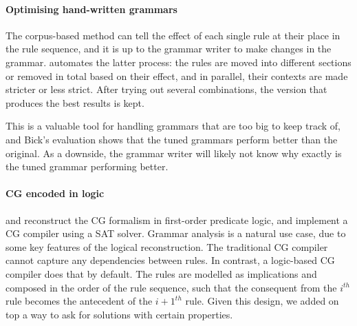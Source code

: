 \paragraph{Optimising hand-written grammars}
The corpus-based method can tell the effect of each single rule at their place in the rule sequence, and it is up to the grammar writer to make changes in the grammar.
\cite{bick2013tuning} automates the latter process: the rules are moved into different sections or removed in total based on their effect, and in parallel, their contexts are made stricter or less strict.
After trying out several combinations, the version that produces the best results is kept.

This is a valuable tool for handling grammars that are too big to keep track of, and Bick's evaluation shows that the tuned grammars perform better than the original.
As a downside, the grammar writer will likely not know why exactly is the tuned grammar performing better.



\paragraph{CG encoded in logic}

\cite{lager98} and \cite{lager_nivre01} reconstruct the CG formalism in first-order predicate logic, and \cite{listenmaa_claessen2015} implement a CG compiler using a SAT solver.
Grammar analysis is a natural use case, due to some key features of the logical reconstruction.
The traditional CG compiler 
 cannot capture any dependencies between rules.
In contrast, a logic-based CG compiler does that by default. 
The rules are modelled as implications and composed in the order of the rule sequence, such that 
the consequent from the $i^{th}$ rule becomes the antecedent of the $i+1^{th}$ rule.
Given this design, we added on top a way to ask for solutions with certain properties.

